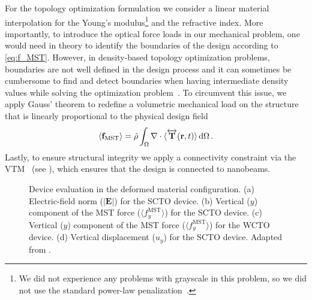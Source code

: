     For the topology optimization formulation we consider a linear material interpolation for the Young's modulus\footnote{We did not experience any problems with grayscale in this problem, so we did not use the standard power-law penalization~\cite{SIMP}.} and the 
    refractive index. More importantly, to introduce the optical force loads in our mechanical problem, one would need in theory to identify the boundaries of the design according to \eqref{eq:f_MST}. However, in density-based topology optimization problems, boundaries
     are not well defined in the design process and it can sometimes be cumbersome to find and detect boundaries when having intermediate density values while solving the optimization problem~\cite{jdara}. To circumvent this issue, we apply Gauss' theorem to
      redefine a volumetric mechanical load on the structure that is linearly proportional to the physical design field
    \begin{equation}
    \langle\mathbf{f}_\text{MST}\rangle= \hat{\rho} \int_{\Omega} \nabla \cdot \langle\overleftrightarrow{\mathbf{T}}(\mathbf{r}, t)\rangle \mathop{}\!\text{d} \Omega\,.
    \end{equation}
    Lastly, to ensure structural integrity we apply a connectivity constraint via the VTM~\cite{li_structural_2016} (see ), which ensures that the design is connected to nanobeams. 


\begin{figure}[tb]
    \centering
    \caption{Device evaluation in the deformed material configuration. (a) Electric-field norm ($\vert\mathbf{E}\vert$) for the SCTO device.
     (b) Vertical ($y$) component of the MST force ($\langle f^\text{MST}_y\rangle$) for the SCTO device. (c) Vertical ($y$) component of
      the MST force ($\langle f^\text{MST}_y\rangle$) for the WCTO device. (d) Vertical displacement ($u_y$) for the SCTO device. Adapted from .}
    \label{fig:SC}
\end{figure}


